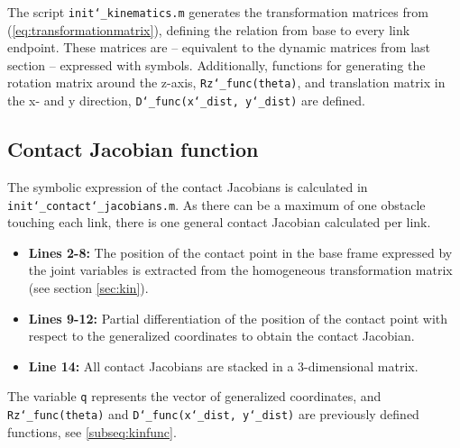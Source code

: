 The script \texttt{init\char`_kinematics.m} generates the transformation matrices from (\ref{eq:transformationmatrix}), defining the relation from base to every link endpoint. These matrices are -- equivalent to the dynamic matrices from last section -- expressed with symbols. Additionally, functions for generating the rotation matrix around the z-axis, \texttt{Rz\char`_func(theta)}, and translation matrix in the x- and y direction, \texttt{D\char`_func(x\char`_dist, y\char`_dist)} are defined.


\subsection{Contact Jacobian function}\label{subseq:Jcfunc}
The symbolic expression of the contact Jacobians is calculated in \\ \texttt{init\char`_contact\char`_jacobians.m}. As there can be a maximum of one obstacle touching each link, there is one general contact Jacobian calculated per link.

\begin{itemize}
    \item \textbf{Lines 2-8:} The position of the contact point in the base frame expressed by the joint variables is extracted from the homogeneous transformation matrix (see section \ref{sec:kin}).
    \item\textbf{Lines 9-12:} Partial differentiation of the position of the contact point with respect to the generalized coordinates to obtain the contact Jacobian.
    \item \textbf{Line 14:} All contact Jacobians are stacked in a 3-dimensional matrix.
\end{itemize}

The variable \texttt{q} represents the vector of generalized coordinates, and \\ \texttt{Rz\char`_func(theta)} and \texttt{D\char`_func(x\char`_dist, y\char`_dist)} are previously defined functions, see \ref{subseq:kinfunc}.




